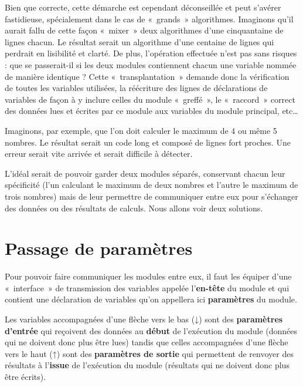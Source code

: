 
	Bien que correcte, cette démarche est cependant déconseillée et peut
	s’avérer fastidieuse, spécialement dans le cas de «~grands~»
	algorithmes. Imaginons qu’il aurait fallu de cette façon «~mixer~» deux
	algorithmes d’une cinquantaine de lignes chacun. Le résultat serait un
	algorithme d’une centaine de lignes qui perdrait en lisibilité et
	clarté. De plus, l’opération effectuée n’est pas sans risques : que se
	passerait-il si les deux modules contiennent chacun une variable nommée
	de manière identique ? Cette «~transplantation~» demande donc la
	vérification de toutes les variables utilisées, la réécriture des
	lignes de déclarations de variables de façon à y inclure celles du
	module «~greffé~», le «~raccord~» correct des données lues et écrites
	par ce module aux variables du module principal, etc… 
	
	Imaginons, par exemple, que l'on doit calculer le
	maximum de 4 ou même 5 nombres. Le résultat serait un code long et
	composé de lignes fort proches. Une erreur serait vite arrivée et
	serait difficile à détecter.
	
	L’idéal serait de pouvoir garder deux modules séparés, conservant chacun
	leur spécificité (l’un calculant le maximum de deux nombres et l’autre
	le maximum de trois nombres) mais de leur permettre de communiquer
	entre eux pour s’échanger des données ou des résultats de calculs. Nous
	allons voir deux solutions.

\section{Passage de paramètres}

	Pour pouvoir faire communiquer les modules entre eux, il faut les
	équiper d’une «~interface~» de transmission des variables appelée
	l’\textbf{en-tête }du module et qui contient une déclaration de
	variables qu’on appellera ici \textbf{paramètres} du module. 
	
	Les variables accompagnées d’une flèche vers le bas (\textsf{↓}) sont
	des \textbf{paramètres d’entrée} qui reçoivent des données au
	\textbf{début} de l’exécution du module (données qui ne doivent donc
	plus être lues) tandis que celles accompagnées d’une flèche vers le
	haut (\textsf{↑}) sont des \textbf{paramètres de sortie} qui permettent
	de renvoyer des résultats à l’\textbf{issue} de l’exécution du module
	(résultats qui ne doivent donc plus être écrits). 

